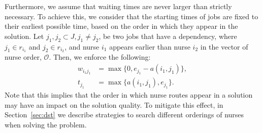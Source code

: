 \documentclass[a4paper,11pt,authoryear]{elsarticle}
\begin{document}
\noindent Furthermore, we assume that waiting times are never larger than strictly necessary. To achieve this, we consider that the starting times of jobs are fixed to their earliest possible time, based on the order in which they appear in the solution. Let $j_1, j_2 \subset J, j_1 \neq j_2$, be two jobs that have a dependency, where $j_1 \in r_{i_1}$ and $j_2 \in r_{i_2}$, and nurse $i_1$ appears earlier than nurse $i_2$ in the vector of nurse order, $\mathcal{O}$. Then, we enforce the following:  
\begin{align}
	w_{i_1 j_1} &= \max \{0, e_{j_1} - a(i_1,j_1)\}, \\ 
		t_{j_1} &= \max \{ a(i_1,j_1), e_{j_1} \}.\label{eq:earliestpossiblestartassumption}
\end{align}
\noindent Note that this implies that the order in which nurse routes appear in a solution may have an impact on the solution quality. To mitigate this effect, in Section~\ref{sec:dst} we describe strategies to search different orderings of nurses when solving the problem.

\end{document}
